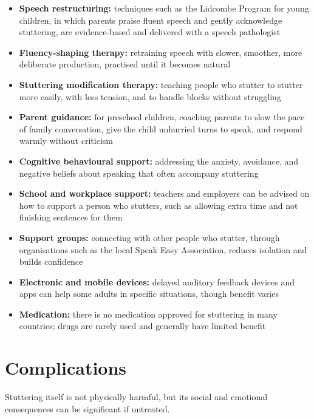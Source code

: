 \begin{itemize}
    \item \textbf{Speech restructuring:} techniques such as the Lidcombe Program for young children, in which parents praise fluent speech and gently acknowledge stuttering, are evidence-based and delivered with a speech pathologist
    \item \textbf{Fluency-shaping therapy:} retraining speech with slower, smoother, more deliberate production, practised until it becomes natural
    \item \textbf{Stuttering modification therapy:} teaching people who stutter to stutter more easily, with less tension, and to handle blocks without struggling
    \item \textbf{Parent guidance:} for preschool children, coaching parents to slow the pace of family conversation, give the child unhurried turns to speak, and respond warmly without criticism
    \item \textbf{Cognitive behavioural support:} addressing the anxiety, avoidance, and negative beliefs about speaking that often accompany stuttering
    \item \textbf{School and workplace support:} teachers and employers can be advised on how to support a person who stutters, such as allowing extra time and not finishing sentences for them
    \item \textbf{Support groups:} connecting with other people who stutter, through organisations such as the local Speak Easy Association, reduces isolation and builds confidence
    \item \textbf{Electronic and mobile devices:} delayed auditory feedback devices and apps can help some adults in specific situations, though benefit varies
    \item \textbf{Medication:} there is no medication approved for stuttering in many countries; drugs are rarely used and generally have limited benefit
\end{itemize}

\section*{Complications}
Stuttering itself is not physically harmful, but its social and emotional consequences can be significant if untreated.


